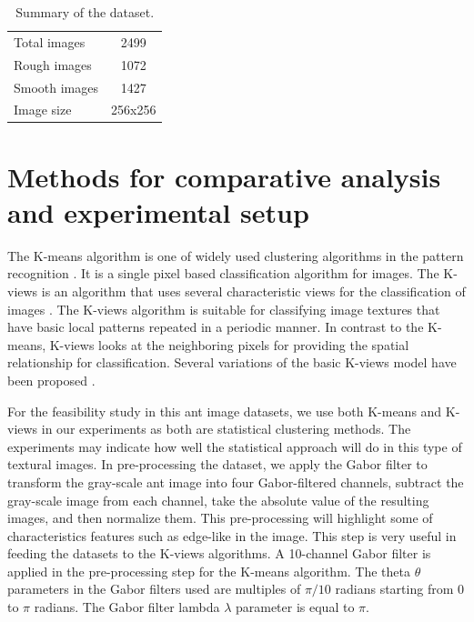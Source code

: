 \documentclass{aci}
\numberwithin{equation}{section}
\begin{document}
\begin{table}[h]
    \centering
    \caption{Summary of the dataset.}
    \begin{tabular}{lc}
        \toprule
        Total images  & 2499    \\
        Rough images  & 1072    \\
        Smooth images & 1427    \\
        Image size    & 256x256 \\
    \end{tabular}
    \label{tab:dataset-summary}
\end{table}

\section{Methods for comparative analysis and experimental setup}


The K-means algorithm is one of widely used clustering algorithms in the pattern
recognition \cite{lloyd_least_1982}. It is a single pixel based classification
algorithm for images. The K-views is an algorithm that uses several
characteristic views for the classification of images \cite{hung_use_2002}. The
K-views algorithm is suitable for classifying image textures that have basic
local patterns repeated in a periodic manner. In contrast to the K-means,
K-views looks at the neighboring pixels for providing the spatial relationship
for classification.  Several variations of the basic K-views model have been
proposed \cite{yang_image_2003, lan_improved_2010}.

For the feasibility study in this ant image datasets, we use both K-means and
K-views in our experiments as both are statistical clustering methods. The
experiments may indicate how well the statistical approach will do in this type
of textural images. In pre-processing the dataset, we apply the Gabor filter to
transform the gray-scale ant image into four Gabor-filtered channels, subtract
the gray-scale image from each channel, take the absolute value of the resulting
images, and then normalize them. This pre-processing will highlight some of
characteristics features such as edge-like in the image. This step is very
useful in feeding the datasets to the K-views algorithms. A 10-channel Gabor
filter is applied in the pre-processing step for the K-means algorithm. The
theta $\theta$ parameters in the Gabor filters used are multiples of $\pi/10$
radians starting from $0$ to $\pi$ radians. The Gabor filter lambda $\lambda$
parameter is equal to $\pi$.
\end{document}
